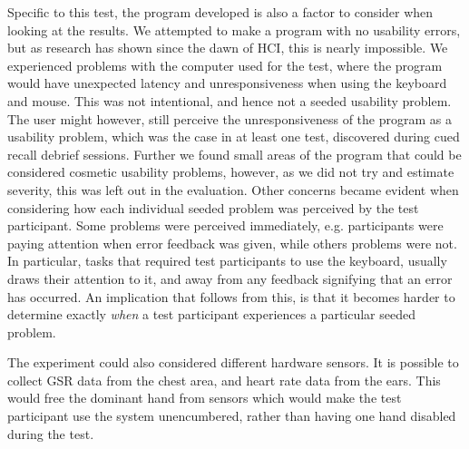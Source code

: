 Specific to this test, the program developed is also a factor to consider when looking at the results.  We attempted to
make a program with no usability errors, but as research has shown since the dawn of HCI, this is nearly impossible.  We
experienced problems with the computer used for the test, where the program would have unexpected latency and unresponsiveness when using the keyboard and mouse. This was not intentional, and hence not a seeded usability problem.
The user might however, still perceive the unresponsiveness of the program as a usability problem, which was the case in
at least one test, discovered during cued recall debrief sessions.
Further we found small areas of the program that could be considered cosmetic usability problems, however, as we did not try
and estimate severity, this was left out in the evaluation. Other concerns became evident when considering how each
individual seeded problem was perceived by the test participant. Some problems were perceived immediately,
e.g. participants were paying attention when error feedback was given, while others problems were not. In particular,
tasks that required test participants to use the keyboard, usually draws their attention to it, and away from any
feedback signifying that an error has occurred. An implication that follows from this, is that it becomes harder to
determine exactly \textit{when} a test participant experiences a particular seeded problem.

The experiment could also considered different hardware sensors.
It is possible to collect GSR data from the chest area, and heart rate data from the ears.
This would free the dominant hand from sensors which would make the test participant use the system unencumbered, rather than having one hand disabled during the test.

